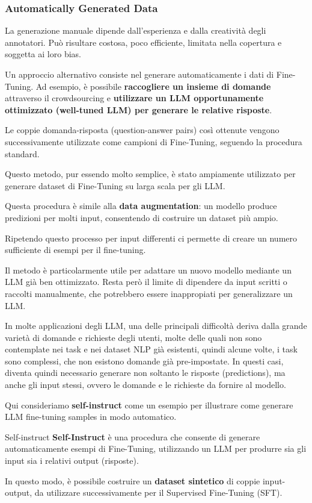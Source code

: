 \subsubsection{Automatically Generated Data}
La generazione manuale dipende dall'esperienza
e dalla creatività degli annotatori.
Può risultare costosa, poco efficiente,
limitata nella copertura e soggetta ai loro bias.

Un approccio alternativo consiste nel generare automaticamente i dati di Fine-Tuning. Ad esempio, è possibile \textbf{raccogliere un insieme di domande} attraverso il crowdsourcing e \textbf{utilizzare un LLM opportunamente ottimizzato (well-tuned LLM) per generare le relative risposte}.

Le coppie domanda-risposta (question-answer pairs) così ottenute vengono successivamente utilizzate come campioni di Fine-Tuning, seguendo la procedura standard.

Questo metodo, pur essendo molto semplice, è stato ampiamente utilizzato per generare dataset di Fine-Tuning su larga scala per gli LLM.

Questa procedura è simile alla
\textbf{data augmentation}: un modello produce
predizioni per molti input, consentendo di costruire
un dataset più ampio.


Ripetendo questo processo per input differenti ci permette di creare un numero sufficiente di esempi per il fine-tuning.


Il metodo è particolarmente utile per adattare
un nuovo modello mediante un LLM già ben ottimizzato.
Resta però il limite di dipendere da input
scritti o raccolti manualmente, che potrebbero essere inappropiati per generalizzare un LLM.


In molte applicazioni degli LLM, una delle principali difficoltà deriva dalla grande varietà di domande e richieste degli utenti, molte delle quali non sono contemplate nei task e nei dataset NLP già esistenti, quindi alcune volte, i task sono complessi, che non esistono domande già pre-impostate.
In questi casi, diventa quindi necessario generare non soltanto le risposte (predictions), ma anche gli input stessi, ovvero le domande e le richieste da fornire al modello.



Qui consideriamo \textbf{self-instruct} come un esempio per illustrare come generare LLM fine-tuning samples in modo automatico.
\begin{definition}{Self-instruct}
\textbf{Self-Instruct} è una procedura che consente di generare
automaticamente esempi di Fine-Tuning, utilizzando un LLM
per produrre sia gli input sia i relativi
output (risposte).

In questo modo, è possibile costruire un \textbf{dataset sintetico}
di coppie input-output, da utilizzare successivamente
per il Supervised Fine-Tuning (SFT).
\end{definition}

